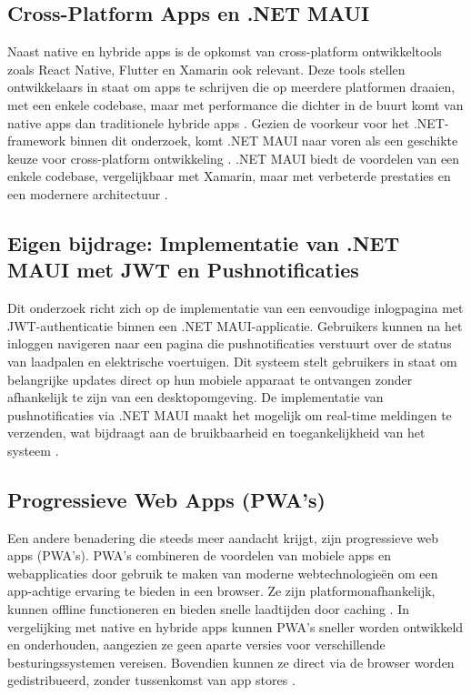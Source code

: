 \subsection{Cross-Platform Apps en .NET MAUI}
\noindent Naast native en hybride apps is de opkomst van cross-platform ontwikkeltools zoals React Native, Flutter en Xamarin ook relevant. Deze tools stellen ontwikkelaars in staat om apps te schrijven die op meerdere platformen draaien, met een enkele codebase, maar met performance die dichter in de buurt komt van native apps dan traditionele hybride apps \autocite{Soegaard2024}. Gezien de voorkeur voor het .NET-framework binnen dit onderzoek, komt .NET MAUI naar voren als een geschikte keuze voor cross-platform ontwikkeling \autocite{Dijk2022}. .NET MAUI biedt de voordelen van een enkele codebase, vergelijkbaar met Xamarin, maar met verbeterde prestaties en een modernere architectuur \autocite{Amazon}.

\subsection{Eigen bijdrage: Implementatie van .NET MAUI met JWT en Pushnotificaties}
\noindent Dit onderzoek richt zich op de implementatie van een eenvoudige inlogpagina met JWT-authenticatie binnen een .NET MAUI-applicatie. Gebruikers kunnen na het inloggen navigeren naar een pagina die pushnotificaties verstuurt over de status van laadpalen en elektrische voertuigen. Dit systeem stelt gebruikers in staat om belangrijke updates direct op hun mobiele apparaat te ontvangen zonder afhankelijk te zijn van een desktopomgeving. De implementatie van pushnotificaties via .NET MAUI maakt het mogelijk om real-time meldingen te verzenden, wat bijdraagt aan de bruikbaarheid en toegankelijkheid van het systeem \autocite{Aussems2021}.

\subsection{Progressieve Web Apps (PWA’s)}
\noindent Een andere benadering die steeds meer aandacht krijgt, zijn progressieve web apps (PWA's). PWA's combineren de voordelen van mobiele apps en webapplicaties door gebruik te maken van moderne webtechnologieën om een app-achtige ervaring te bieden in een browser. Ze zijn platformonafhankelijk, kunnen offline functioneren en bieden snelle laadtijden door caching \autocite{Fortunato2018}. In vergelijking met native en hybride apps kunnen PWA's sneller worden ontwikkeld en onderhouden, aangezien ze geen aparte versies voor verschillende besturingssystemen vereisen. Bovendien kunnen ze direct via de browser worden gedistribueerd, zonder tussenkomst van app stores \autocite{BioernHansen2018}.

